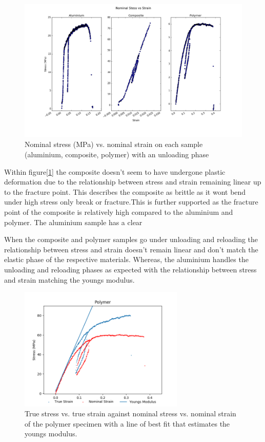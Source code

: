\documentclass[a4paper,10pt]{article}
\begin{document}
\begin{figure}[htb]
\centering
\includegraphics[width=\textwidth]{figure_1.png}
\caption{Nominal stress (MPa) vs. nominal strain on each sample (aluminium, composite, polymer) with an unloading phase}
\label{Fig7}
\end{figure}
 
 Within figure[\ref{Fig7}] the composite doesn't seem to have undergone plastic deformation due to the relationship between stress and strain remaining linear up to the fracture point. This describes the composite as brittle as it wont bend under high stress only break or fracture.This is further supported as the fracture point of the composite is relatively high compared to the aluminium and polymer. The aluminium sample has a clear\par
 When the composite and polymer samples go under unloading and reloading the relationship between stress and strain doesn't remain linear and don't match the elastic phase of the respective materials. Whereas, the aluminium handles the unloading and reloading phases as expected with the relationship between stress and strain matching the youngs modulus.\\[8pt]

\begin{figure}[!]
\centering
\includegraphics[width=0.7\textwidth]{figure_2_pol.png}
\caption{True stress vs. true strain against nominal stress vs. nominal strain of the polymer specimen with a line of best fit that estimates the youngs modulus.}
\label{Fig8}
\end{figure}
\end{document}
